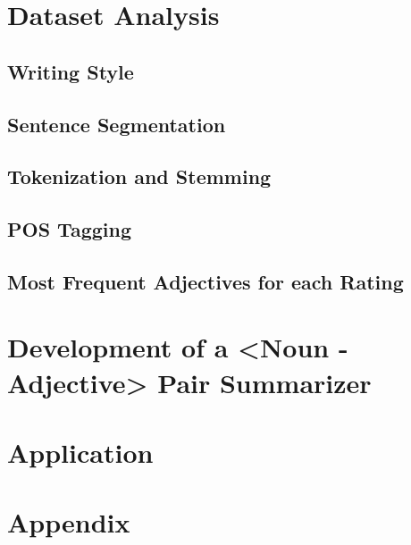 \documentclass[sigchi]{acmart}
\begin{document}

	
	
	
	\maketitle
	
	\section{Dataset Analysis}
	\subsection{Writing Style}
	
	\subsection{Sentence Segmentation}
	
	\subsection{Tokenization and Stemming}
	
	\subsection{POS Tagging}
	
	\subsection{Most Frequent Adjectives for each Rating}
	
	\section{Development of a <Noun - Adjective> Pair Summarizer}
	
	\section{Application}
	
	\newpage
	\section{Appendix}
	
	
	
\end{document}
